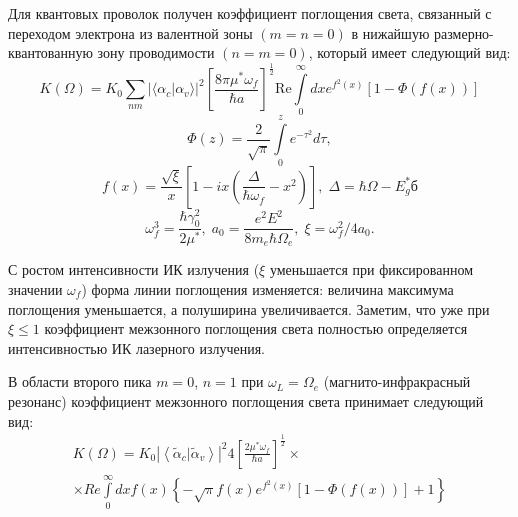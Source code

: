 Для квантовых проволок получен коэффициент поглощения света, связанный с переходом электрона из валентной зоны $(m=n=0)$ в нижайшую размерно-квантованную зону проводимости $(n=m=0)$, который имеет следующий вид:
\begin{equation} \label{eq:syn_12}
K\left(\Omega\right)=K_0\sum_{nm}{ {\lvert\langle \alpha_c | \alpha_v \rangle\rvert}^2 {\left[\frac{8\pi \mu^*\omega_f}{\hbar a}\right]}^{\frac{1}{2}} \mathrm{Re} \int\limits_0^\infty {dx e^{f^2\left(x\right)}\left[1-\Phi \left(f\left(x\right)\right)\right]}}
\end{equation}
\[
\Phi \left(z\right)=\frac{2}{\sqrt{\pi}}\int\limits_0^z {e^{-\tau^2}}d\tau ,
\] 
\[
f\left(x\right)=\frac{\sqrt{\xi}}{x}\left[1-ix\left(\frac{\Delta }{\hbar \omega_f}-x^2\right)\right],\; \Delta =\hbar \Omega-E^*_gб\] 
\[ \omega^3_f = \frac{\hbar \gamma^2_0}{2\mu^*}, \; a_0=\frac{e^2 E^2}{8 m_e \hbar\Omega_e}, \; \xi = \omega^2_f / 4a_0.
\] 

С ростом интенсивности ИК излучения ($\xi $ уменьшается при фиксированном значении $\omega_f$) форма линии поглощения изменяется: величина максимума поглощения уменьшается, а полуширина увеличивается. Заметим, что уже при $\xi \le 1$ коэффициент межзонного поглощения света полностью определяется интенсивностью ИК лазерного излучения.

В области второго пика $m=0$, $n=1$ при $\omega_L=\Omega_e$ (магнито-инфракрасный резонанс) коэффициент межзонного поглощения света принимает следующий вид:
\begin{multline} \label{eq:syn_14}
K\left(\Omega\right)=K_0 {\left|\left\langle \widetilde{\alpha }_c |\widetilde{\alpha }_v\right\rangle \right|}^2 4{\left[\frac{2{\mu }^*{\omega }_f}{\hbar a}\right]}^{\frac{1}{2}}\times\\
\times Re\int\limits^{\infty }_0 {dx} f(x)\left\{-\sqrt{\pi }f\left(x\right)e^{f^2\left(x\right)}\left[1-\Phi \left(f\left(x\right)\right)\right]+1\right\}
\end{multline} 



